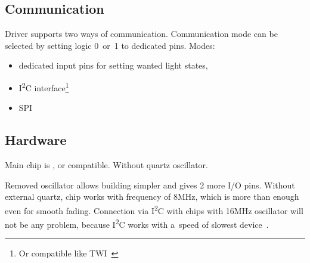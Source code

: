 
\subsection{Communication}
Driver supports two ways of communication. Communication mode can be selected by setting logic 0~or~1 to dedicated pins.
\newline
Modes:
\begin{itemize}
	\item dedicated input pins for setting wanted light states,
	\item I\textsuperscript{2}C interface\footnote{Or compatible like TWI~\cite{i2c-twi}}
	\item SPI
\end{itemize}


\subsection{Hardware}
Main chip is , or compatible. Without quartz oscillator.

Removed oscillator allows building simpler and gives 2 more I/O pins. Without external quartz, chip works with frequency of 8MHz, which is more than enough
even for smooth fading. Connection via I\textsuperscript{2}C with chips with 16MHz oscillator will not be any problem, because I\textsuperscript{2}C works
with a~speed of slowest device~\cite{i2cspeed}.
